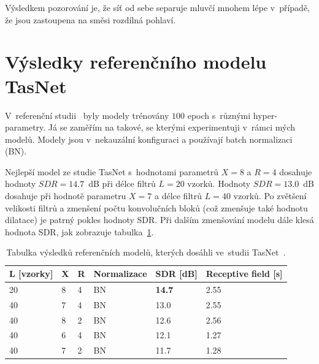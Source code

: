 Výsledkem pozorování je, že síť od sebe separuje mluvčí mnohem lépe v~případě, že jsou zastoupena na směsi rozdílná pohlaví.





\section{Výsledky referenčního modelu TasNet}
V~referenční studii~\cite{luo2018convtasnet} byly modely trénovány $100$ epoch s~různými hyper-parametry. Já se zaměřím na takové, se kterými experimentuji v~rámci mých modelů. Modely jsou v~nekauzální konfiguraci a používají batch normalizaci (BN).

Nejlepší model ze studie TasNet s~hodnotami parametrů $X=8$ a $R=4$ dosahuje hodnoty $SDR = 14.7$~dB při délce filtrů $L = 20$ vzorků. Hodnoty $SDR = 13.0$~dB dosahuje při hodnotě parametru $X = 7$ a délce filtrů $L = 40$ vzorků. Po zvětšení velikosti filtrů a zmenšení počtu konvolučních bloků (což zmenšuje také hodnotu dilatace) je patrný pokles hodnoty SDR. Při dalším zmenšování modelu dále klesá hodnota SDR, jak zobrazuje tabulka~\ref{tab:tasnet}.

\begin{table}[!htbp]
\centering
\caption{Tabulka výsledků referenčních modelů, kterých dosáhli ve~studii TasNet~\cite{luo2018convtasnet}.}
\label{tab:tasnet}
\begin{tabular}{|l|l|l|l|l|l|}
\hline
\textbf{L {[}vzorky{]}} & \textbf{X} & \textbf{R} & \textbf{Normalizace} & \textbf{SDR {[}dB{]}} & \textbf{Receptive field {[}s{]}} \\ \hline
20 & 8 & 4 & BN & \textbf{14.7} & 2.55 \\ \hline
40 & 7 & 4 & BN & 13.0 & 2.55 \\ \hline
40 & 8 & 2 & BN & 12.6 & 2.56 \\ \hline
40 & 6 & 4 & BN & 12.1 & 1.27 \\ \hline
40 & 7 & 2 & BN & 11.7 & 1.28 \\ \hline
\end{tabular}
\end{table}

